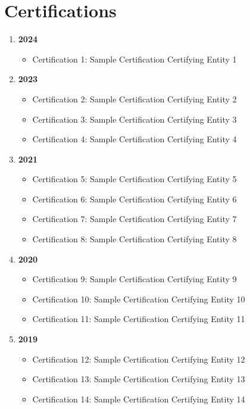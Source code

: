 \section{Certifications}

\begin{enumerate}[itemsep=0pt,label={},leftmargin=*]
  \item \textbf{2024}
    \begin{itemize}[label={},leftmargin=*]
        \item Certification 1: Sample Certification \hfill Certifying Entity 1
    \end{itemize}
  \item \textbf{2023}
    \begin{itemize}[label={},leftmargin=*]
        \item Certification 2: Sample Certification \hfill Certifying Entity 2
        \item Certification 3: Sample Certification \hfill Certifying Entity 3
        \item Certification 4: Sample Certification \hfill Certifying Entity 4
    \end{itemize}
  \item \textbf{2021}
    \begin{itemize}[label={},leftmargin=*]
        \item Certification 5: Sample Certification \hfill Certifying Entity 5
        \item Certification 6: Sample Certification \hfill Certifying Entity 6
        \item Certification 7: Sample Certification \hfill Certifying Entity 7
        \item Certification 8: Sample Certification \hfill Certifying Entity 8
    \end{itemize}
  \item \textbf{2020}
    \begin{itemize}[label={},leftmargin=*]
        \item Certification 9: Sample Certification \hfill Certifying Entity 9
        \item Certification 10: Sample Certification \hfill Certifying Entity 10
        \item Certification 11: Sample Certification \hfill Certifying Entity 11
    \end{itemize}
  \item \textbf{2019}
    \begin{itemize}[label={},leftmargin=*]
        \item Certification 12: Sample Certification \hfill Certifying Entity 12
        \item Certification 13: Sample Certification \hfill Certifying Entity 13
        \item Certification 14: Sample Certification \hfill Certifying Entity 14
    \end{itemize}
\end{enumerate}
